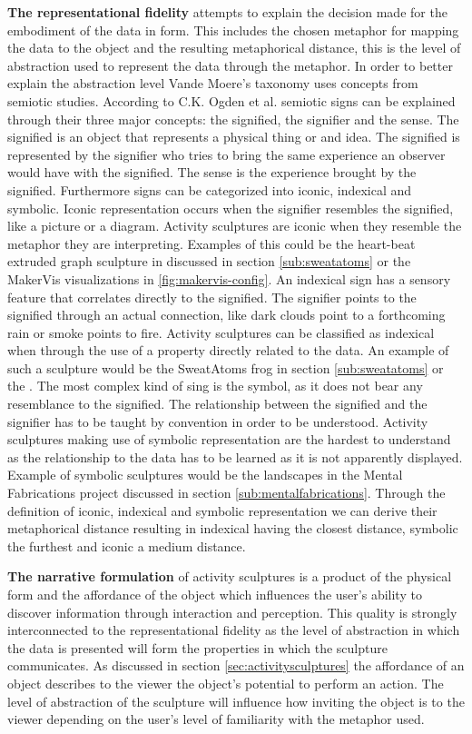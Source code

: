 \documentclass[../medieninformatik-arbeit.tex]{subfiles}
\begin{document}
\textbf{The representational fidelity} attempts to explain the decision made for the embodiment of the data in form. This includes the chosen metaphor for mapping the data to the object and the resulting metaphorical distance, this is the level of abstraction used to represent the data through the metaphor. In order to better explain the abstraction level Vande Moere's taxonomy uses concepts from semiotic studies. According to C.K. Ogden et al.\cite{ogden1946meaning} semiotic signs can be explained through their three major concepts: the signified, the signifier and the sense. The signified is an object that represents a physical thing or and idea. The signified is represented by the signifier who tries to bring the same experience an observer would have with the signified. The sense is the experience brought by the signified. Furthermore signs can be categorized into iconic, indexical and symbolic. Iconic representation occurs when the signifier resembles the signified, like a picture or a diagram. Activity sculptures are iconic when they resemble  the metaphor they are interpreting. Examples of this could be the heart-beat extruded graph sculpture in discussed in section \ref{sub:sweatatoms} or the MakerVis visualizations in \ref{fig:makervis-config}. An indexical sign has a sensory feature that correlates directly to the signified. The signifier points to the signified through an actual connection, like dark clouds point to a forthcoming rain or smoke points to fire. Activity sculptures can be classified as indexical when through the use of a property directly related to the data. An example of such a sculpture would be the SweatAtoms frog in section \ref{sub:sweatatoms} or the . The most complex kind of sing is the symbol, as it does not bear any resemblance to the signified. The relationship between the signified and the signifier has to be taught by convention in order to be understood. Activity sculptures making use of symbolic representation are the hardest to understand as the relationship to the data has to be learned as it is not apparently displayed. Example of symbolic sculptures would be the landscapes in the Mental Fabrications project discussed in section \ref{sub:mentalfabrications}. Through the definition of iconic, indexical and symbolic representation we can derive their metaphorical distance resulting in indexical having the closest distance, symbolic the furthest and iconic a medium distance\cite{swaminathan2014supporting}. 

\textbf{The narrative formulation} of activity sculptures is a product of the physical form and the affordance of the object which influences the user's ability to discover information through interaction and perception. This quality is strongly interconnected to the representational fidelity as the level of abstraction in which the data is presented will form the properties in which the sculpture communicates. As discussed in section \ref{sec:activitysculptures} the affordance of an object describes to the viewer the object's potential to perform an action. The level of abstraction of the sculpture will influence how inviting the object is to the viewer depending on the user's level of familiarity with the metaphor used. 
\end{document}

